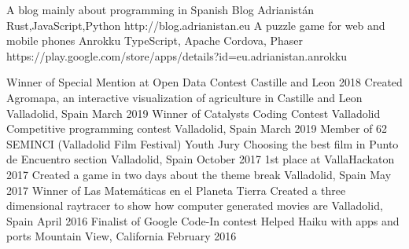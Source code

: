 \documentclass[]{awesome-cv}
\begin{document}
\vspace{-7mm}
\begin{cventries}
	\cventry
	{A blog mainly about programming in Spanish}
	{Blog Adrianistán}
	{Rust,JavaScript,Python}
	{http://blog.adrianistan.eu}
	{}
	\cventry
	{A puzzle game for web and mobile phones}
	{Anrokku}
	{TypeScript, Apache Cordova, Phaser}
	{}
	{https://play.google.com/store/apps/details?id=eu.adrianistan.anrokku}

	\vspace{-5mm}
\end{cventries}
\begin{cvhonors}
	\cvhonor
	{Winner of Special Mention at Open Data Contest Castille and Leon 2018}
	{Created Agromapa, an interactive visualization of agriculture in Castille and Leon}
	{Valladolid, Spain}
	{March 2019}
	\cvhonor
	{Winner of Catalysts Coding Contest Valladolid}
	{Competitive programming contest}
	{Valladolid, Spain}
	{March 2019}
	\cvhonor
	{Member of 62 SEMINCI (Valladolid Film Festival) Youth Jury}
	{Choosing the best film in Punto de Encuentro section}
	{Valladolid, Spain}
	{October 2017}
	\cvhonor
	{1st place at VallaHackaton 2017}
	{Created a game in two days about the theme \textquotedbl{}break\textquotedbl{}}
	{Valladolid, Spain}
	{May 2017}
	\cvhonor
	{Winner of \textquotedbl{}Las Matemáticas en el Planeta Tierra\textquotedbl{}}
	{Created a three dimensional raytracer to show how computer generated movies are}
	{Valladolid, Spain}
	{April 2016}
	\cvhonor
	{Finalist of Google Code-In contest}
	{Helped Haiku with apps and ports}
	{Mountain View, California}
	{February 2016}
\end{cvhonors}
\ 
\end{document}
